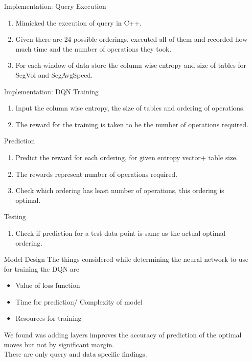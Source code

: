 \begin{frame}{Implementation: Query Execution}
    \begin{enumerate}
        \item Mimicked the execution of query in C++.
        \item Given there are 24 possible orderings, executed all of them and recorded how much time and the number of operations they took.
        \item For each window of data store the column wise entropy and size of tables for SegVol and SegAvgSpeed.
    \end{enumerate}
\end{frame}

\begin{frame}{Implementation: DQN}
    Training
    \begin{enumerate}
        \item Input the column wise entropy, the size of tables and ordering of operations.
        \item The reward for the training is taken to be the number of operations required.
    \end{enumerate}
    Prediction
    \begin{enumerate}
        \item Predict the reward for each ordering, for given entropy vector+ table size.\\
        \item The rewards represent number of operations required.
        \item Check which ordering has least number of operations, this ordering is optimal.
    \end{enumerate}
    Testing
    \begin{enumerate}
        \item Check if prediction for a test data point is same as the actual optimal ordering.
    \end{enumerate}
\end{frame}

\begin{frame}{Model Design}
The things considered while determining the neural network to use for training the DQN are
    \begin{itemize}
        \item Value of loss function
        \item Time for prediction/ Complexity of model
        \item Resources for training
    \end{itemize}
    We found was adding layers improves the accuracy of prediction of the optimal moves but not by significant margin.\\
    These are only query and data specific findings.
\end{frame}
